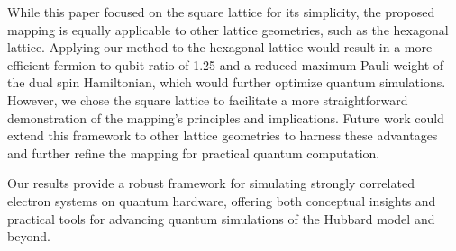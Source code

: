 \documentclass[aps,prl,twocolumn,floatfix,10pt,amssymb,amsfont,amsmath,superscriptaddress,float,nofootinbib,longbibliography,nobalancelastpage]{revtex4-2}
\begin{document}
While this paper focused on the square lattice for its simplicity, the proposed mapping is equally applicable to other lattice geometries, such as the hexagonal lattice. Applying our method to the hexagonal lattice would result in a more efficient fermion-to-qubit ratio of 1.25 and a reduced maximum Pauli weight of the dual spin Hamiltonian, which would further optimize quantum simulations. However, we chose the square lattice to facilitate a more straightforward demonstration of the mapping's principles and implications. Future work could extend this framework to other lattice geometries to harness these advantages and further refine the mapping for practical quantum computation.

Our results provide a robust framework for simulating strongly correlated electron systems on quantum hardware, offering both conceptual insights and practical tools for advancing quantum simulations of the Hubbard model and beyond.

\end{document}
